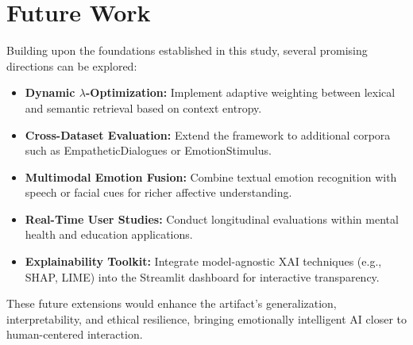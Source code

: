 \section{Future Work}
Building upon the foundations established in this study, several promising directions can be explored:
\begin{itemize}
    \item \textbf{Dynamic $\lambda$-Optimization:} Implement adaptive weighting between lexical and semantic retrieval based on context entropy.
    \item \textbf{Cross-Dataset Evaluation:} Extend the framework to additional corpora such as EmpatheticDialogues or EmotionStimulus.
    \item \textbf{Multimodal Emotion Fusion:} Combine textual emotion recognition with speech or facial cues for richer affective understanding.
    \item \textbf{Real-Time User Studies:} Conduct longitudinal evaluations within mental health and education applications.
    \item \textbf{Explainability Toolkit:} Integrate model-agnostic XAI techniques (e.g., SHAP, LIME) into the Streamlit dashboard for interactive transparency.
\end{itemize}
These future extensions would enhance the artifact’s generalization, interpretability, and ethical resilience, bringing emotionally intelligent AI closer to human-centered interaction.
